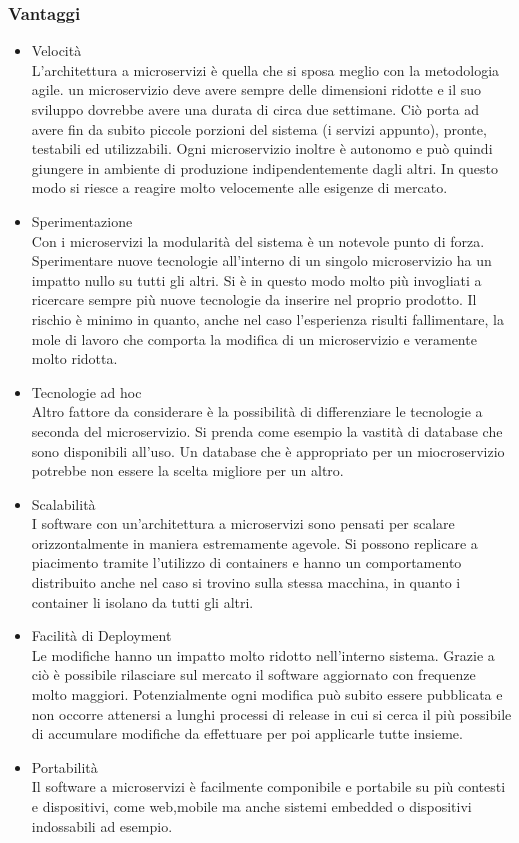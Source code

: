 \subsubsection{Vantaggi}
\begin{itemize}
	\item  Velocità \\
	L'architettura a microservizi è quella che si sposa meglio con la metodologia agile. un microservizio deve avere sempre delle dimensioni ridotte e il suo sviluppo  dovrebbe avere una durata di circa due settimane. Ciò porta ad avere fin da subito piccole porzioni del sistema (i servizi appunto), pronte, testabili ed utilizzabili. Ogni microservizio inoltre è autonomo e può quindi giungere in ambiente di produzione indipendentemente dagli altri. In questo modo si riesce a reagire molto velocemente alle esigenze di mercato.
	
	\item Sperimentazione \\
	Con i microservizi la modularità del sistema è un notevole punto di forza. Sperimentare nuove tecnologie all'interno di un singolo microservizio ha un impatto nullo su tutti gli altri. Si è in questo modo molto più invogliati a ricercare sempre più nuove tecnologie da inserire nel proprio prodotto. Il rischio è minimo in quanto, anche nel caso l'esperienza risulti fallimentare, la mole di lavoro che comporta la modifica di un microservizio e veramente molto ridotta.
	
	\item Tecnologie ad hoc \\
	Altro fattore da considerare è la possibilità di differenziare le tecnologie a seconda del microservizio. Si prenda come esempio la vastità di database che sono disponibili all'uso. Un database che è appropriato per un miocroservizio potrebbe non essere la scelta migliore per un altro. 
	
	\item Scalabilità \\
	I software con un'architettura a microservizi sono pensati per scalare orizzontalmente in maniera estremamente agevole. Si possono replicare a piacimento tramite l'utilizzo di containers e hanno un comportamento distribuito anche nel caso si trovino sulla stessa macchina, in quanto i container li isolano da tutti gli altri.
	
	\item Facilità di Deployment \\
	Le modifiche hanno un impatto molto ridotto nell'interno sistema. Grazie a ciò è possibile rilasciare sul mercato il software aggiornato con frequenze molto maggiori. Potenzialmente ogni modifica può subito essere pubblicata e non occorre attenersi a lunghi processi di release in cui si cerca il più possibile di accumulare modifiche da effettuare per poi applicarle tutte insieme.
	
	\item Portabilità \\
	Il software a microservizi è facilmente componibile e portabile su più contesti e dispositivi, come web,mobile ma anche sistemi embedded o dispositivi indossabili ad esempio.	
\end{itemize}

